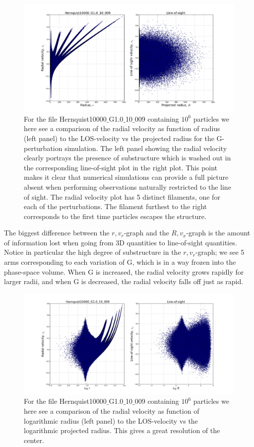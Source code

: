 \begin{figure}
\centering
\includegraphics[width=1.0\linewidth]{img/LOS.png}
\caption{For the file Hernquist10000$\_$G1.0$\_$10$\_$009 containing $10^6$ particles we here see a comparison of the radial velocity as function of radius (left panel) to the LOS-velocity vs the projected radius for the G-perturbation simulation. The left panel showing the radial velocity clearly portrays the presence of substructure which is washed out in the corresponding line-of-sight plot in the right plot. This point makes it clear that numerical simulations can provide a full picture absent when performing observations naturally restricted to the line of sight. The radial velocity plot has 5 distinct filaments, one for each of the perturbations. The filament furthest to the right corresponds to the first time particles escapes the structure.}
\label{fig:test}
\end{figure}

The biggest difference between the $r, v_r$-graph and the $R, v_x$-graph is the amount of information lost when going from 3D quantities to line-of-sight quantities.
Notice in particular the high degree of substructure in the $r, v_r$-graph;
we see 5 arms corresponding to each variation of G, which is in a way frozen into the phase-space volume. When G is increased, the radial velocity grows rapidly for larger radii, and when G is decreased, the radial velocity falls off just as rapid. 

\begin{figure}
\centering
\includegraphics[width=1.0\linewidth]{img/LOS_logr.png}
\caption{For the file Hernquist10000$\_$G1.0$\_$10$\_$009 containing $10^6$ particles we here see a comparison of the radial velocity as function of logarithmic radius (left panel) to the LOS-velocity vs the logarithmic projected radius. This gives a great resolution of the center.}
\label{fig:test}
\end{figure}


